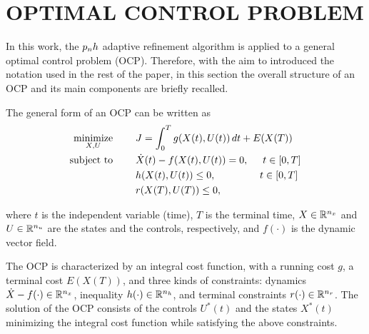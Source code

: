 \section*{OPTIMAL CONTROL PROBLEM}

In this work, the $p_{n}h$ adaptive refinement algorithm is applied to a general optimal control problem (OCP). Therefore, with the aim to introduced the notation used in the rest of the paper, in this section the overall structure of an OCP and its main components are briefly recalled.


The general form of an OCP can be written as
\begin{subequations}\label{OCP}
	\begin{align}
	\underset{X,U}{\text{minimize}}\hspace{8mm} &J = \int_{0}^{T}g(X(t),U(t))\,dt + E(X(T)) \label{eq:cost}\\
	\text{subject to} \hspace{8mm} &\dot{X}(t) -  f(X(t),U(t)) = 0, \hspace{5mm} t \in[0,T] \label{eq:dyn}\\
	& h(X(t),U(t)) \leq 0,  \hspace{15.5mm} t \in[0,T] \label{eq:path}\\
	& r(X(T),U(T)) \leq 0, \label{eq:terminal}		
	\end{align}
\end{subequations}

where $t$ is the independent variable (time), $T$ is the terminal time, $X \in \mathbb{R}^{n_{x}}$ and $U \in \mathbb{R}^{n_{u}}$ are the states and the controls, respectively, and $f (\cdot)$ is the dynamic vector field.

The OCP is characterized by an integral cost function, with a running cost $g$, a terminal cost $E(X(T))$, and three kinds of constraints: dynamics $\dot{X}-f(\cdot) \in \mathbb{R}^{n_{x}}$, inequality $h(\cdot) \in \mathbb{R}^{n_{h}}$, and terminal constraints $r(\cdot) \in \mathbb{R}^{n_{r}}$.
The solution of the OCP  consists of the controls $U^{*}(t)$ and the states $X^*(t)$  minimizing the integral cost function while satisfying the above constraints.


